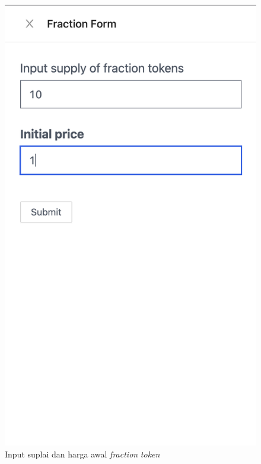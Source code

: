 \begin{itemize}
\begin{figure} [H]
            \includegraphics[scale=0.4]{gambar/img-test-share-fraction-1.png}
            \caption{Input suplai dan harga awal \emph{fraction} \emph{token}}
            \label{fig:TestShareInputSupplyFractionToken}
        \end{figure}
        \begin{figure} [H] \centering

\end{figure}
\end{itemize}
